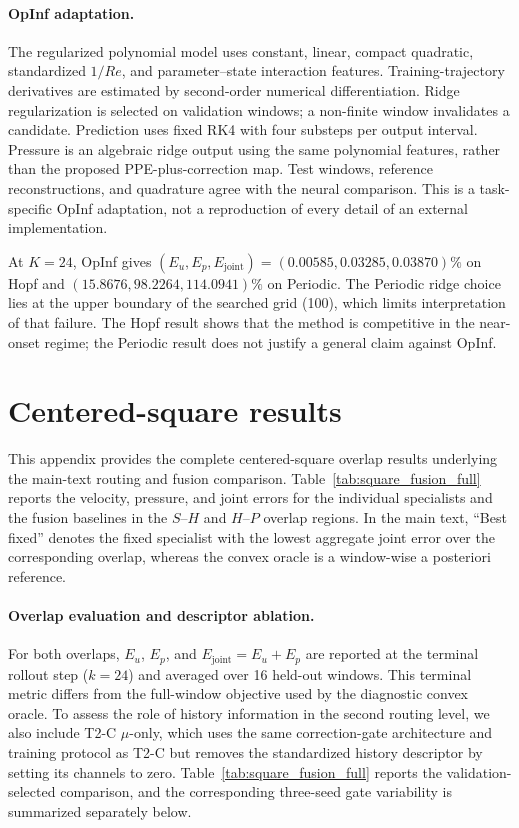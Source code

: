 \documentclass{article}
\providecommand{\DIFaddtex}[1]{{\protect\color{blue} \sf #1}} %
\providecommand{\DIFaddbegin}{} %
\providecommand{\DIFaddend}{} %
\providecommand{\DIFadd}[1]{\texorpdfstring{\DIFaddtex{#1}}{#1}} %
\begin{document}
\paragraph{\DIFadd{OpInf adaptation.}}
\DIFadd{The regularized polynomial model uses constant, linear, compact quadratic,
standardized $1/Re$, and parameter--state interaction features.
Training-trajectory derivatives are estimated by second-order numerical
differentiation. Ridge regularization is selected on validation windows;
a non-finite window invalidates a candidate. Prediction uses fixed RK4
with four substeps per output interval. Pressure is an algebraic ridge
output using the same polynomial features, rather than the proposed
PPE-plus-correction map. Test windows, reference reconstructions, and
quadrature agree with the neural comparison. This is a task-specific
OpInf adaptation, not a reproduction of every detail of an external
implementation.
}

\DIFadd{At $K=24$, OpInf gives $(E_u,E_p,E_{\mathrm{joint}})=
(0.00585,0.03285,0.03870)\%$ on Hopf and
$(15.8676,98.2264,114.0941)\%$ on Periodic.
The Periodic ridge choice lies at the upper boundary of the searched
grid (100), which limits interpretation of that failure. The Hopf result
shows that the method is competitive in the near-onset regime; the
Periodic result does not justify a general claim against OpInf.
}

\DIFaddend \FloatBarrier
\DIFaddbegin 

\DIFaddend \section{Centered-square results}
\label{app:square}


This appendix provides the complete centered-square overlap results
underlying the main-text routing and fusion comparison. Table~\ref{tab:square_fusion_full} reports the velocity, pressure,
and joint errors for the individual specialists and the fusion baselines in the $S$--$H$ and $H$--$P$ overlap regions. In the main text, ``Best fixed'' denotes the fixed specialist with the
lowest aggregate joint error over the corresponding overlap, whereas the convex oracle is a window-wise a posteriori reference.



\paragraph{Overlap evaluation and descriptor ablation.}
For both overlaps, $E_u$, $E_p$, and $E_{\mathrm{joint}}=E_u+E_p$ are reported at the terminal rollout step ($k=24$) and averaged over 16 held-out windows.  This terminal metric differs from the full-window objective used by the diagnostic convex oracle. To assess the role of history information in the second routing level, we also include T2-C $\mu$-only, which uses the same correction-gate architecture and training protocol as T2-C but removes the standardized history descriptor by setting its channels to zero. Table~\ref{tab:square_fusion_full} reports the validation-selected comparison, and the corresponding three-seed gate variability is summarized separately below.
\end{document}
